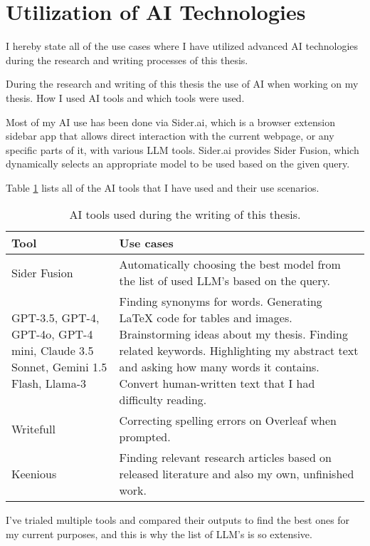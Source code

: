 



\chapter*{Utilization of AI Technologies\label{extra:declaration}}

I hereby state all of the use cases where I have utilized advanced AI technologies during the research and writing processes of this thesis.

During the research and writing of this thesis the use of AI when working on my thesis. How I used AI tools and which tools were used.

Most of my AI use has been done via Sider.ai, which is a browser extension sidebar app that allows direct interaction with the current webpage, or any specific parts of it, with various LLM tools. Sider.ai provides Sider Fusion, which dynamically selects an appropriate model to be used based on the given query.

Table \ref{table:declaration} lists all of the AI tools that I have used and their use scenarios.

\begin{table}[h]
  \centering
  \begin{tabularx}{\textwidth}{X X}
    \hline
    \textbf{Tool} & \textbf{Use cases} \\
    \hline
    Sider Fusion & Automatically choosing the best model from the list of used LLM's based on the query. \\
    \hline
    GPT-3.5, GPT-4, GPT-4o, GPT-4 mini, Claude 3.5 Sonnet, Gemini 1.5 Flash, Llama-3 & Finding synonyms for words. Generating LaTeX code for tables and images. Brainstorming ideas about my thesis. Finding related keywords. Highlighting my abstract text and asking how many words it contains. Convert human-written text that I had difficulty reading.\\
    \hline
    Writefull& Correcting spelling errors on Overleaf when prompted. \\
    \hline
    Keenious & Finding relevant research articles based on released literature and also my own, unfinished work. \\
    \hline
  \end{tabularx}
  \caption{AI tools used during the writing of this thesis.}
  \label{table:declaration}
\end{table}

I've trialed multiple tools and compared their outputs to find the best ones for my current purposes, and this is why the list of LLM's is so extensive.